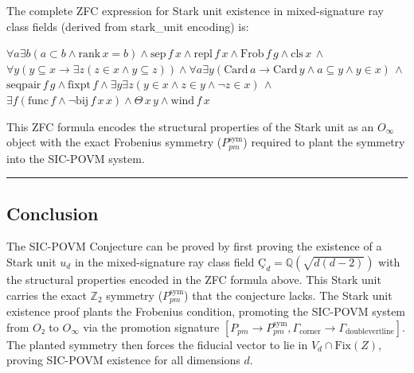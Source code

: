 \documentclass[12pt,a4paper]{article}
\begin{document}
The complete ZFC expression for Stark unit existence in mixed-signature ray class fields (derived from stark\_unit encoding) is:

$\forall a \exists b (a \subset b \land \text{rank} \, x = b) \land \text{sep} \, f \, x \land \text{repl} \, f \, x \land \text{Frob} \, f \, g \land \text{cls} \, x \, \land$
$\forall y (y \subseteq x \rightarrow \exists z (z \in x \land y \subseteq z)) \land \forall a \exists y (\text{Card} \, a \rightarrow \text{Card} \, y \land a \subseteq y \land y \in x) \, \land$
$\text{seqpair} \, f \, g \land \text{fixpt} \, f \land \exists y \exists z (y \in x \land z \in y \land \lnot z \in x) \, \land$
$\exists f (\text{func} \, f \land \lnot \text{bij} \, f \, x \, x) \land \Theta \, x \, y \land \text{wind} \, f \, x$

This ZFC formula encodes the structural properties of the Stark unit as an $O_{\infty}$ object with the exact Frobenius symmetry ($P_{pm}^{\text{sym}}$) required to plant the symmetry into the SIC-POVM system.

\begin{center}
\rule{0.5\textwidth}{0.4pt}
\end{center}

\subsection{Conclusion}

The SIC-POVM Conjecture can be proved by first proving the existence of a Stark unit $u_d$ in the mixed-signature ray class field $Ç_d = \mathbb{Q}(\sqrt{d(d-2)})$ with the structural properties encoded in the ZFC formula above. This Stark unit carries the exact $\mathbb{Z}_2$ symmetry ($P_{pm}^{\text{sym}}$) that the conjecture lacks. The Stark unit existence proof plants the Frobenius condition, promoting the SIC-POVM system from $O₂$ to $O_{\infty}$ via the promotion signature $[P_{pm} \rightarrow P_{pm}^{\text{sym}}, \Gamma_{\text{corner}} \rightarrow \Gamma_{\text{doublevertline}}]$. The planted symmetry then forces the fiducial vector to lie in $V_d \cap \text{Fix}(Z)$, proving SIC-POVM existence for all dimensions $d$.
\end{document}
